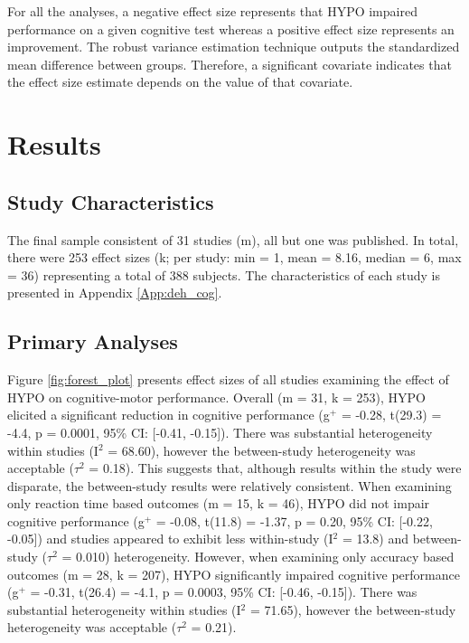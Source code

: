 For all the analyses, a negative effect size represents that HYPO impaired performance on a given cognitive test whereas a positive effect size represents an improvement. The robust variance estimation technique outputs the standardized mean difference between groups. Therefore, a significant covariate indicates that the effect size estimate depends on the value of that covariate.

\section{Results}

\subsection{Study Characteristics}
The final sample consistent of 31 studies (m), all but one was published. In total, there were 253 effect sizes (k; per study: min = 1, mean = 8.16, median = 6, max = 36) representing a total of 388 subjects. The characteristics of each study is presented in Appendix \ref{App:deh_cog}. 

\subsection{Primary Analyses}
Figure \ref{fig:forest_plot} presents effect sizes of all studies examining the effect of HYPO on cognitive-motor performance. Overall (m = 31, k = 253), HYPO elicited a significant reduction in cognitive performance (g${^+}$ = -0.28, t(29.3) = -4.4, p = 0.0001, 95\% CI: [-0.41, -0.15]). There was substantial heterogeneity within studies (I${^2}$ = 68.60), however the between-study heterogeneity was acceptable (${\tau}$${^2}$ = 0.18). This suggests that, although results within the study were disparate, the between-study results were relatively consistent. When examining only reaction time based outcomes (m = 15, k = 46), HYPO did not impair cognitive performance (g${^+}$ = -0.08, t(11.8) = -1.37, p = 0.20, 95\% CI: [-0.22, -0.05]) and studies appeared to exhibit less within-study (I${^2}$ = 13.8) and between-study (${\tau}$${^2}$ = 0.010) heterogeneity. However, when examining only accuracy based outcomes (m = 28, k = 207), HYPO significantly impaired cognitive performance (g${^+}$ = -0.31, t(26.4) = -4.1, p = 0.0003, 95\% CI: [-0.46, -0.15]). There was substantial heterogeneity within studies (I${^2}$ = 71.65), however the between-study heterogeneity was acceptable (${\tau}$${^2}$ = 0.21).

